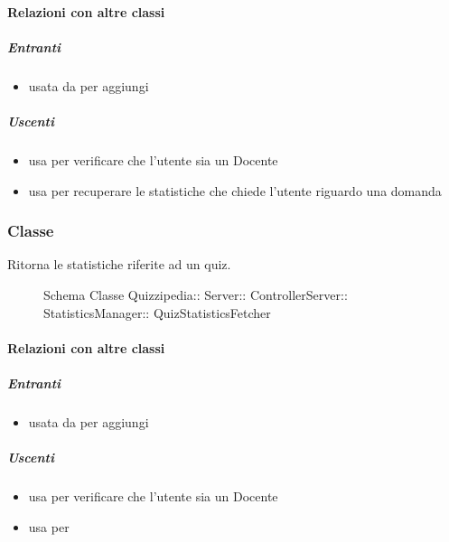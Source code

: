 \paragraph{Relazioni con altre classi}
\subparagraph{Entranti}
\begin{itemize}
\item usata da  per aggiungi
\end{itemize}
\subparagraph{Uscenti}
\begin{itemize}
\item usa  per verificare che l'utente sia un Docente
\item usa  per recuperare le statistiche che chiede l'utente riguardo una domanda
\end{itemize}
\subsubsection{Classe }
Ritorna le statistiche riferite ad un quiz.
\begin{figure}[H]
\centering
\noindent{}
\caption[Schema Classe QuizStatisticsFetcher]{Schema Classe Quizzipedia:: Server:: ControllerServer:: StatisticsManager:: QuizStatisticsFetcher}
\end{figure}
\paragraph{Relazioni con altre classi}
\subparagraph{Entranti}
\begin{itemize}
\item usata da  per aggiungi
\end{itemize}
\subparagraph{Uscenti}
\begin{itemize}
\item usa  per verificare che l'utente sia un Docente
\item usa  per 
\end{itemize}
